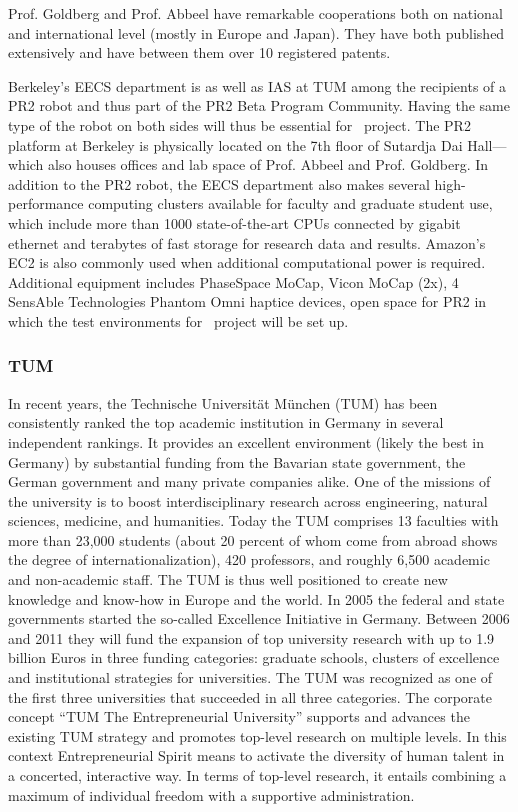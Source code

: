 Prof. Goldberg and Prof. Abbeel have remarkable cooperations both on national
and international level (mostly in Europe and Japan). They have both published 
extensively and have between them over 10 registered patents. 

Berkeley's EECS department is as well as IAS at TUM among the recipients
of a PR2 robot and thus part of the PR2 Beta Program Community. 
Having the
same type of the robot on both sides will thus be essential for \ksem\ project.
The PR2 platform at Berkeley is physically located on the 7th floor of 
Sutardja Dai Hall---which also houses offices and lab
space of Prof. Abbeel and Prof. Goldberg. In addition to the PR2 robot,
the EECS department also makes several high-performance computing
clusters available for faculty and graduate student use, which include 
more than 1000 state-of-the-art CPUs connected by gigabit ethernet and 
terabytes of fast storage for research data and results. Amazon's EC2 is also
commonly used when additional computational power is required.
Additional equipment includes PhaseSpace MoCap, Vicon MoCap (2x),
4 SensAble Technologies Phantom Omni haptice devices, open space for
PR2 in which the test environments for \ksem\ project will be set up.

\subsubsection{TUM}
In  recent years, the  Technische Universit\"at  M\"unchen (TUM)  has been
consistently ranked the top academic institution in Germany in several
independent rankings. It provides an excellent environment (likely the
best  in  Germany) by  substantial  funding  from  the Bavarian  state
government,   the  German  government   and  many   private  companies
alike.  One   of  the   missions  of  the   university  is   to  boost
interdisciplinary  research   across  engineering,  natural  sciences,
medicine, and  humanities. Today the  TUM comprises 13  faculties with
more than 23,000  students (about 20 percent of  whom come from abroad
shows the degree of internationalization), 420 professors, and roughly
6,500 academic  and non-academic staff. The TUM is thus well
positioned  to create  new knowledge  and know-how  in Europe  and the
world.  In  2005  the  federal  and  state  governments  started  the
so-called Excellence Initiative in Germany. Between 2006 and 2011 they
will  fund the expansion  of top  university research  with up  to 1.9
billion Euros in three  funding categories: graduate schools, clusters
of excellence  and institutional strategies for  universities. The TUM
was recognized as  one of the first three  universities that succeeded
in   all   three  categories.    The   corporate   concept  ``TUM   The
Entrepreneurial  University'' supports  and advances  the  existing TUM
strategy and  promotes top-level research on multiple  levels. In this
context Entrepreneurial  Spirit means  to activate the  diversity of
human talent  in a concerted,  interactive way. In terms  of top-level
research, it entails combining a  maximum of individual freedom with a
supportive administration.


